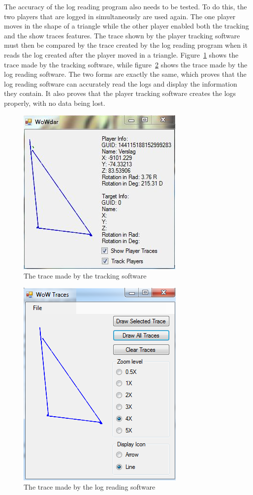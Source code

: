 The accuracy of the log reading program also needs to be tested. To do this, the two players that are logged in simultaneously are used again. The one player moves in the shape of a triangle while the other player enabled both the tracking and the show traces features. The trace shown by the player tracking software must then be compared by the trace created by the log reading program when it reads the log created after the player moved in a triangle. Figure~\ref{tracetest1} shows the trace made by the tracking software, while figure~\ref{tracetest2} shows the trace made by the log reading software. The two forms are exactly the same, which proves that the log reading software can accurately read the logs and display the information they contain. It also proves that the player tracking software creates the logs properly, with no data being lost.

\begin{figure}[htbp]
\centering
\includegraphics[scale = 0.75]{tracetest.png}	
\caption{The trace made by the tracking software}
\label{tracetest1}
\end{figure}

\begin{figure}[htbp]
\centering
\includegraphics[scale = 0.75]{tracetest2.png}	
\caption{The trace made by the log reading software}
\label{tracetest2}
\end{figure}

